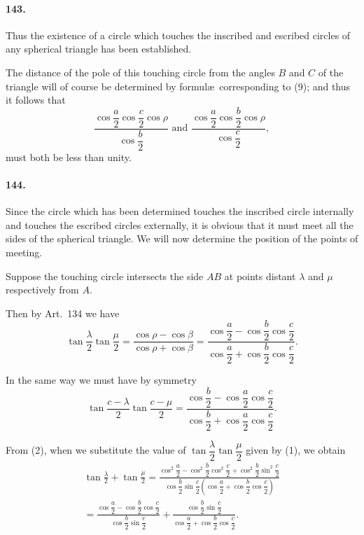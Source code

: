 \documentclass{book}[2004/02/16]
\begin{document}
\begin{mainmatter}
\begin{spacing}{1.3}
\paragraph{143.} Thus the existence of a circle which touches the inscribed
and escribed circles of any spherical triangle has been
established.

The distance of the pole of this touching circle from the
angles $B$ and $C$ of the triangle will of course be determined by
formul\ae\ corresponding to (9); and thus it follows that
\[
\frac{\cos\dfrac{a}{2} \cos\dfrac{c}{2} \cos\rho }{\cos\dfrac{b}{2} } \text{ and }
\frac{\cos\dfrac{a}{2} \cos\dfrac{b}{2} \cos\rho }{\cos\dfrac{c}{2} },
\]
must both be less than unity.

\paragraph{144.} Since the circle which has been determined touches
the inscribed circle internally and touches the escribed circles
externally, it is obvious that it must meet all the sides of the
spherical triangle. We will now determine the position of the
points of meeting.

Suppose the touching circle intersects the side $AB$ at points
distant $\lambda$ and $\mu$ respectively from $A$.

Then by Art.~134 we have
\[
\tan\frac{\lambda}{2} \tan\frac{\mu}{2} = \frac{\cos\rho - \cos\beta}{\cos\rho + \cos\beta}
= \frac{\cos\dfrac{a}{2} - \cos\dfrac{b}{2} \cos\dfrac{c}{2} }{\cos\dfrac{a}{2} + \cos\dfrac{b}{2} \cos\dfrac{c}{2} }. \tag{1}
\]

In the same way we must have by symmetry
\[
\tan\frac{c - \lambda}{2} \tan\frac{c - \mu}{2}
= \frac{\cos\dfrac{b}{2} - \cos\dfrac{a}{2} \cos\dfrac{c}{2} }{\cos\dfrac{b}{2} + \cos\dfrac{a}{2} \cos\dfrac{c}{2}}. \tag{2}
\]

From (2), when we substitute the value of $\tan\dfrac{\lambda}{2} \tan\dfrac{\mu}{2}$ given
by (1), we obtain
\begin{gather*}
\tan\frac{\lambda}{2} + \tan\frac{\mu}{2} =
\frac{\cos^2 \dfrac{a}{2} - \cos^2 \dfrac{b}{2} \cos^2 \dfrac{c}{2} + \cos^2 \dfrac{b}{2} \sin^2 \dfrac{c}{2} }{\cos \dfrac{b}{2} \sin \dfrac{c}{2} \left(\cos \dfrac{a}{2} + \cos \dfrac{b}{2} \cos \dfrac{c}{2}\right) }\\
= \frac{\cos \dfrac{a}{2} - \cos \dfrac{b}{2} \cos \dfrac{c}{2} }
       {\cos \dfrac{b}{2}   \sin \dfrac{c}{2} }
+ \frac{\cos \dfrac{b}{2}   \sin \dfrac{c}{2} }
       {\cos \dfrac{a}{2} + \cos \dfrac{b}{2} \cos \dfrac{c}{2} }. \tag{3}
\end{gather*}


\end{spacing}
\end{mainmatter}
\end{document}
